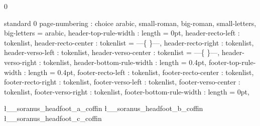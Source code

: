 %
%
%
% 
%


%



%

 { 0 }


 { standard } { 0 }
  {
    page-numbering           : choice
      { arabic, small-roman, big-roman, small-letters, big-letters }
                                         = arabic,
    header-top-rule-width    : length    = 0pt,
    header-recto-left        : tokenlist,
    header-recto-center      : tokenlist = ---\enspace\{\,\thepage\,\}\enspace---,
    header-recto-right       : tokenlist,
    header-verso-left        : tokenlist,
    header-verso-center      : tokenlist = ---\enspace\{\,\thepage\,\}\enspace---,
    header-verso-right       : tokenlist,
    header-bottom-rule-width : length    = 0.4pt,
    footer-top-rule-width    : length    = 0.4pt,
    footer-recto-left        : tokenlist,
    footer-recto-center      : tokenlist,
    footer-recto-right       : tokenlist,
    footer-verso-left        : tokenlist,
    footer-verso-center      : tokenlist,
    footer-verso-right       : tokenlist,
    footer-bottom-rule-width : length    = 0pt,
  }


\NewCoffin \l__soranus_headfoot_a_coffin
\NewCoffin \l__soranus_headfoot_b_coffin
\NewCoffin \l__soranus_headfoot_c_coffin


